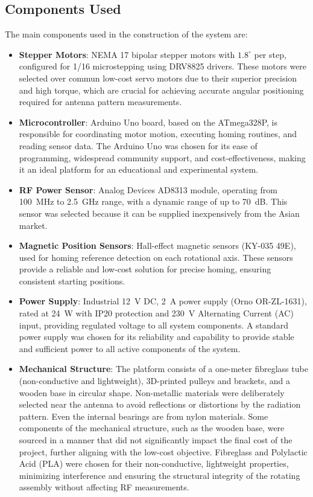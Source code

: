 \subsection{Components Used}
\label{subsec:components_used}

The main components used in the construction of the system are:

\begin{itemize}
 \item \textbf{Stepper Motors}: NEMA 17 bipolar stepper motors with $1.8 ^ \circ$ per step, configured for 1/16 microstepping using DRV8825 drivers. These motors were selected over commun low-cost servo motors due to their superior precision and high torque, which are crucial for achieving accurate angular positioning required for antenna pattern measurements. 
\item \textbf{Microcontroller}: Arduino Uno board, based on the ATmega328P, is responsible for coordinating motor motion, executing homing routines, and reading sensor data. The Arduino Uno was chosen for its ease of programming, widespread community support, and cost-effectiveness, making it an ideal platform for an educational and experimental system.
 \item \textbf{RF Power Sensor}: Analog Devices AD8313 module, operating from 100~MHz to 2.5~GHz range, with a dynamic range of up to 70~dB. This sensor was selected because it can be supplied inexpensively from the Asian market. %
\item \textbf{Magnetic Position Sensors}: Hall-effect magnetic sensors (KY-035 49E), used for homing reference detection on each rotational axis. These sensors provide a reliable and low-cost solution for precise homing, ensuring consistent starting positions.
\item \textbf{Power Supply}: Industrial 12~V DC, 2~A power supply (Orno OR-ZL-1631), rated at 24~W with IP20 protection and 230~V Alternating Current (AC) input, providing regulated voltage to all system components. A standard power supply was chosen for its reliability and capability to provide stable and sufficient power to all active components of the system.
\item \textbf{Mechanical Structure}: The platform consists of a one-meter fibreglass tube (non-conductive and lightweight), 3D-printed pulleys and brackets, and a wooden base in circular shape. Non-metallic materials were deliberately selected near the antenna to avoid reflections or distortions by the radiation pattern. Even the internal bearings are from nylon materials. Some components of the mechanical structure, such as the wooden base, were sourced in a manner that did not significantly impact the final cost of the project, further aligning with the low-cost objective. Fibreglass and Polylactic Acid (PLA) were chosen for their non-conductive, lightweight properties, minimizing interference and ensuring the structural integrity of the rotating assembly without affecting RF measurements.

\end{itemize}
